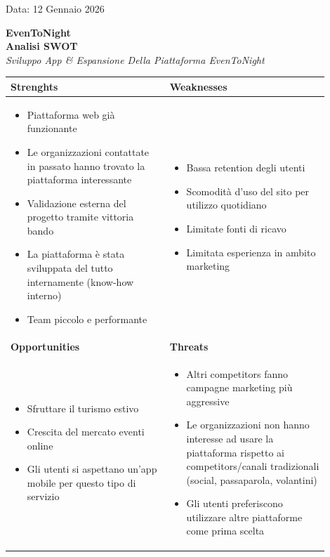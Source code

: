 \documentclass[11pt,a4paper]{article}
\newcommand{\allegatohead}[1]{%
  \begin{center}
    {\color{brand}\Huge\bfseries EvenToNight}\\[8pt]
    {\color{doclink}\LARGE\bfseries #1}\\[6pt]
    {\color{subt}\large\itshape Sviluppo App \& Espansione Della Piattaforma EvenToNight}
  \end{center}
  \vspace{1em}
}
\begin{document}
{}

{Data: 12 Gennaio 2026}

\clearpage
{}\label{sec:swot}
\allegatohead{Analisi SWOT}

\renewcommand{\arraystretch}{1.3}
\setlength{\tabcolsep}{8pt}
\noindent\begin{tabular}{|>{\raggedright\arraybackslash}p{0.45\linewidth}|>{\raggedright\arraybackslash}p{0.45\linewidth}|}
\hline
\rowcolor{brandbg}\textbf{Strenghts} & \textbf{Weaknesses} \\\hline
\begin{itemize}[leftmargin=1.2em,itemsep=2pt,topsep=2pt]
\item Piattaforma web già funzionante
\item Le organizzazioni contattate in passato hanno trovato la piattaforma interessante
\item Validazione esterna del progetto tramite vittoria bando
\item La piattaforma è stata sviluppata del tutto internamente (know-how interno)
\item Team piccolo e performante
\end{itemize}
&
\begin{itemize}[leftmargin=1.2em,itemsep=2pt,topsep=2pt]
\item Bassa retention degli utenti
\item Scomodità d’uso del sito per utilizzo quotidiano
\item Limitate fonti di ricavo
\item Limitata esperienza in ambito marketing
\end{itemize}
\\\hline
\rowcolor{brandbg}\textbf{Opportunities} & \textbf{Threats} \\\hline
\begin{itemize}[leftmargin=1.2em,itemsep=2pt,topsep=2pt]
\item Sfruttare il turismo estivo
\item Crescita del mercato eventi online
\item Gli utenti si aspettano un’app mobile per questo tipo di servizio
\end{itemize}
&
\begin{itemize}[leftmargin=1.2em,itemsep=2pt,topsep=2pt]
\item Altri competitors fanno campagne marketing più aggressive
\item Le organizzazioni non hanno interesse ad usare la piattaforma rispetto ai competitors/canali tradizionali (social, passaparola, volantini)
\item Gli utenti preferiscono utilizzare altre piattaforme come prima scelta
\end{itemize}
\\\hline
\end{tabular}
\end{document}
